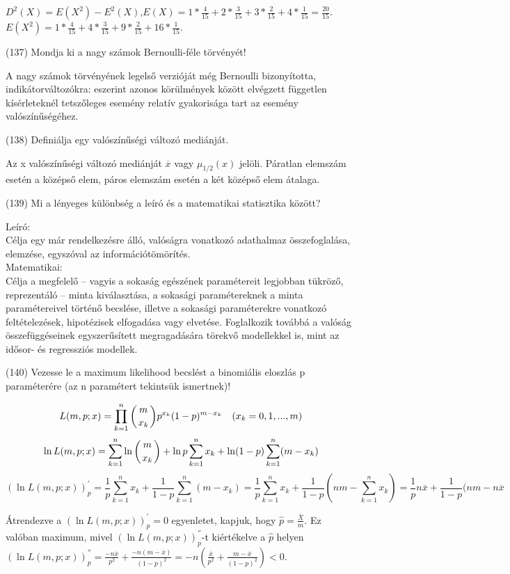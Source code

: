\documentclass[12p]{article}
\begin{document}
$D^2(X) = E(X^2) - E^2(X)$,$E(X) = 1 * \frac{4}{15} + 2 * \frac{3}{15} + 3 * \frac{2}{15} + 4 * \frac{1}{15} = \frac{20}{15}$.\\
$E(X^2) = 1 * \frac{4}{15} + 4 * \frac{3}{15} + 9 * \frac{2}{15} + 16 * \frac{1}{15}$.

(137) Mondja ki a nagy számok Bernoulli-féle törvényét!

A nagy számok törvényének legelső verzióját
még Bernoulli bizonyította,
indikátorváltozókra: eszerint azonos
körülmények között elvégzett független
kísérleteknél tetszőleges esemény relatív
gyakorisága tart az esemény
valószínűségéhez.

(138) Definiálja egy valószínűségi változó mediánját.

Az x valószínűségi változó mediánját $\overline{x}$ vagy $\mu_{1/2}(x)$ jelöli.
Páratlan elemszám esetén a középső elem, páros elemszám esetén a két középső elem átalaga.

(139) Mi a lényeges különbség a leíró és a matematikai statisztika között?

Leíró:\\
Célja egy már rendelkezésre álló, valóságra vonatkozó adathalmaz összefoglalása, elemzése, egyszóval az információtömörítés.\\
Matematikai:\\
Célja a megfelelő – vagyis a sokaság egészének paramétereit legjobban tükröző, reprezentáló – minta kiválasztása, a sokasági paramétereknek a minta paramétereivel történő becslése, illetve a sokasági paraméterekre vonatkozó feltételezések, hipotézisek elfogadása vagy elvetése. Foglalkozik továbbá a valóság összefüggéseinek egyszerűsített megragadására törekvő modellekkel is, mint az idősor- és regressziós modellek.

(140) Vezesse le a maximum likelihood becslést a binomiális eloszlás p paraméterére (az n paramétert tekintsük ismertnek)!

$$L(m, p; x) = \prod_{k=1}^n \displaystyle{\left({m \atop x_k}\right)}p^{x_k}(1-p)^{m-x_k} \quad (x_k = 0, 1, ..., m)$$
$$\ln L(m, p; x) = \sum^n_{k=1} \ln \left ({m \atop x_k}\right) + \ln p \sum^n_{k=1} x_k + \ln(1-p) \sum^n_{k=1}(m-x_k)$$
$$(\ln L(m,p;x))^{'}_p = \frac{1}{p} \sum^n_{k=1}x_k + \frac{1}{1-p} \sum^n_{k=1} (m - x_k) = \frac{1}{p} \sum^n_{k=1}x_k + \frac{1}{1-p}
\left(nm- \sum^n_{k=1}x_k \right) = \frac{1}{p}n\overline{x} + \frac{1}{1-p}(nm-n\overline{x}$$

Átrendezve a $(\ln L(m,p;x))^{'}_p = 0$ egyenletet, kapjuk, hogy $\hat{p} = \frac{\overline{X}}{m}$.  Ez valóban maximum, mivel $(\ln L(m,p;x))^{''}_p$-t kiértékelve a $\hat{p}$ helyen $(\ln L(m,p;x))^{''}_p = \frac{-n \overline{x}}{p^2} + \frac{-n(m-\overline{x})}{(1-p)^2}=
-n\left(\frac{\overline{x}}{p^2}+\frac{m - \overline{x}}{(1-p)^2}\right)<0$.
\end{document}
